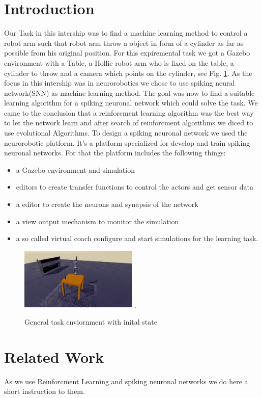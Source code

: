 \section{Introduction}
Our Task in this intership was to find a machine learning method to control a robot arm such that robot arm throw a object in form of a cylinder as far as possible from his original position. For this expiremental task we got a Gazebo environment with a Table, a Hollie robot arm who is fixed on the table, a cylinder to throw and a camera which points on the cylinder, see Fig. \ref{init_state}.
As the focus in this intership was in neurorobotics we chose to use spiking neural network(SNN) as machine learning method. The goal was now to find a suitable learning algorithm for a spiking neuronal network which could solve the task. We came to the conclusion that a reinforcment learning algorithm was the best way to let the network learn and after search of reinforcment algorithms we diced to use evolutional Algorithms. 
To design a spiking neuronal network we used the neurorobotic platform. It's a platform specialized for develop and train spiking neuronal networks. For that the platform includes the following things:
 \begin{itemize}
\item a Gazebo environment and simulation
\item editors to create transfer functions to control the actors and get sensor data
\item a editor to create the neurons and synapsis of the network
\item a view output mechanism to monitor the simulation
\item a so called virtual coach configure and start simulations for the learning task.
\end{itemize} 
\begin{figure}[H]
	\centering
	\includegraphics[width=2.2in]{img/init_state.png}
	\DeclareGraphicsExtensions.
	\caption{General task enviornment with inital state }
	\label{init_state}
\end{figure}
\section{Related Work}
As we use Reinforcment Learning and spiking neuronal networks we do here a short instruction to them.

